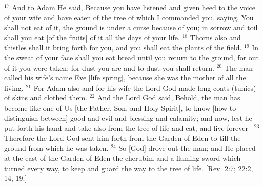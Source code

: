 $^{17}$ And to Adam He said, Because you have listened and given heed to the voice of your wife and have eaten of the tree of which I commanded you, saying, You shall not eat of it, the ground is under a curse because of you; in sorrow and toil shall you eat [of the fruits] of it all the days of your life.
$^{18}$ Thorns also and thistles shall it bring forth for you, and you shall eat the plants of the field.
$^{19}$ In the sweat of your face shall you eat bread until you return to the ground, for out of it you were taken; for dust you are and to dust you shall return.
$^{20}$ The man called his wife's name Eve [life spring], because she was the mother of all the living.
$^{21}$ For Adam also and for his wife the Lord God made long coats (tunics) of skins and clothed them.
$^{22}$ And the Lord God said, Behold, the man has become like one of Us [the Father, Son, and Holy Spirit], to know [how to distinguish between] good and evil and blessing and calamity; and now, lest he put forth his hand and take also from the tree of life and eat, and live forever–
$^{23}$ Therefore the Lord God sent him forth from the Garden of Eden to till the ground from which he was taken.
$^{24}$ So [God] drove out the man; and He placed at the east of the Garden of Eden the cherubim and a flaming sword which turned every way, to keep and guard the way to the tree of life. [Rev. 2:7; 22:2, 14, 19.]
